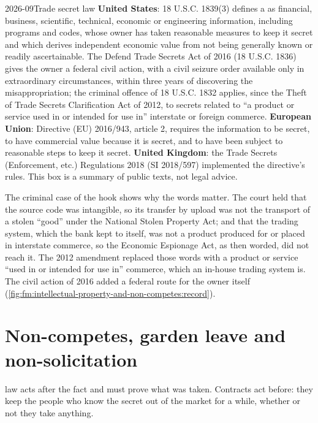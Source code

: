 \begin{dated}{2026-09}{Trade secret law}\label{dat:fm:intellectual-property-and-non-competes:law}
\textbf{United States}: 18 U.S.C. 1839(3) defines a  as financial, business, scientific, technical, economic or engineering
information, including programs and codes, whose owner has taken reasonable measures to keep it secret and which derives independent economic
value from not being generally known or readily ascertainable. The Defend Trade Secrets Act of 2016 (18 U.S.C. 1836) gives the owner a federal civil
action, with a civil seizure order available only in extraordinary circumstances, within three years of discovering the misappropriation; the
criminal offence of 18 U.S.C. 1832 applies, since the Theft of Trade Secrets Clarification Act of 2012, to secrets related to ``a product or
service used in or intended for use in'' interstate or foreign commerce. \textbf{European Union}: Directive (EU) 2016/943, article 2, requires the
information to be secret, to have commercial value because it is secret, and to have been subject to reasonable steps to keep it secret.
\textbf{United Kingdom}: the Trade Secrets (Enforcement, etc.) Regulations 2018 (SI 2018/597) implemented the directive's rules. This box is a
summary of public texts, not legal advice.
\end{dated}

The criminal case of the hook shows why the words matter. The court held that the source code was intangible, so its transfer by upload was not
the transport of a stolen ``good'' under the National Stolen Property Act; and that the trading system, which the bank kept to itself, was not a
product produced for or placed in interstate commerce, so the Economic Espionage Act, as then worded, did not reach it. The 2012 amendment replaced
those words with a product or service ``used in or intended for use in'' commerce, which an in-house trading system is. The civil action of 2016
added a federal route for the owner itself (\cref{fig:fm:intellectual-property-and-non-competes:record}).

\section{Non-competes, garden leave and non-solicitation}

 law acts after the fact and must prove what was taken. Contracts act before: they keep the people who know the secret out of the
market for a while, whether or not they take anything.

